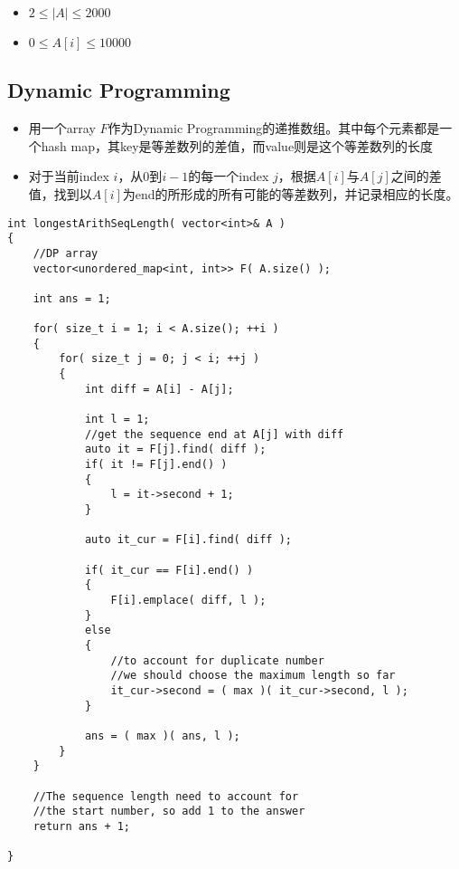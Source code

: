 \begin{itemize}
\item $2 \leq |A| \leq 2000$
\item $0 \leq A[i] \leq 10000$
\end{itemize}

\subsection{Dynamic Programming}
\begin{itemize}
\item 用一个array $F$作为Dynamic Programming的递推数组。其中每个元素都是一个hash map，其key是等差数列的差值，而value则是这个等差数列的长度
\item 对于当前index $i$，从0到$i-1$的每一个index $j$，根据$A[i]$与$A[j]$之间的差值，找到以$A[i]$为end的所形成的所有可能的等差数列，并记录相应的长度。
\end{itemize}

\setcounter{lstlisting}{0}
\begin{lstlisting}[style=customc, caption={Dynamic Progamming}]
int longestArithSeqLength( vector<int>& A )
{
    //DP array
    vector<unordered_map<int, int>> F( A.size() );

    int ans = 1;

    for( size_t i = 1; i < A.size(); ++i )
    {
        for( size_t j = 0; j < i; ++j )
        {
            int diff = A[i] - A[j];

            int l = 1;
            //get the sequence end at A[j] with diff
            auto it = F[j].find( diff );
            if( it != F[j].end() )
            {
                l = it->second + 1;
            }

            auto it_cur = F[i].find( diff );

            if( it_cur == F[i].end() )
            {
                F[i].emplace( diff, l );
            }
            else
            {
                //to account for duplicate number
                //we should choose the maximum length so far
                it_cur->second = ( max )( it_cur->second, l );
            }

            ans = ( max )( ans, l );
        }
    }

    //The sequence length need to account for
    //the start number, so add 1 to the answer
    return ans + 1;

}
\end{lstlisting}